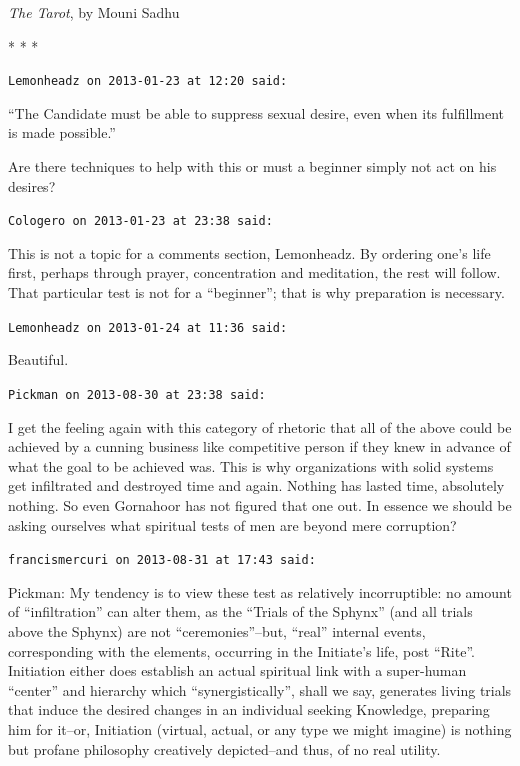 \textit{The Tarot}, by Mouni Sadhu



\begin{center}* * *\end{center}

\begin{footnotesize}
\begin{sffamily}
\texttt{Lemonheadz on 2013-01-23 at 12:20 said:}

``The Candidate must be able to suppress sexual desire, even when its fulfillment is made possible.''

Are there techniques to help with this or must a beginner simply not act on his desires?

\hfill

\texttt{Cologero on 2013-01-23 at 23:38 said:}

This is not a topic for a comments section, Lemonheadz. By ordering one's life first, perhaps through prayer, concentration and meditation, the rest will follow. That particular test is not for a ``beginner''; that is why preparation is necessary.

\hfill

\texttt{Lemonheadz on 2013-01-24 at 11:36 said:}

Beautiful.

\hfill

\texttt{Pickman on 2013-08-30 at 23:38 said:}

I get the feeling again with this category of rhetoric that all of the above could be achieved by a cunning business like competitive person if they knew in advance of what the goal to be achieved was. This is why organizations with solid systems get infiltrated and destroyed time and again. Nothing has lasted time, absolutely nothing. So even Gornahoor has not figured that one out. In essence we should be asking ourselves what spiritual tests of men are beyond mere corruption?

\texttt{francismercuri on 2013-08-31 at 17:43 said:}

Pickman: My tendency is to view these test as relatively incorruptible: no amount of ``infiltration'' can alter them, as the ``Trials of the Sphynx'' (and all trials above the Sphynx) are not ``ceremonies''--but, ``real'' internal events, corresponding with the elements, occurring in the Initiate's life, post ``Rite''. Initiation either does establish an actual spiritual link with a super-human ``center'' and hierarchy which ``synergistically'', shall we say, generates living trials that induce the desired changes in an individual seeking Knowledge, preparing him for it--or, Initiation (virtual, actual, or any type we might imagine) is nothing but profane philosophy creatively depicted--and thus, of no real utility.


\end{sffamily}
\end{footnotesize}
